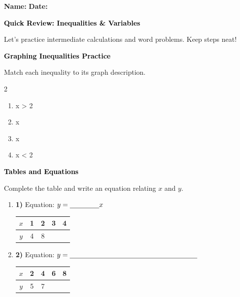 \documentclass[12pt, letterpaper, fleqn]{article}
\newcommand{\blank}{\underline{\hspace{2.2cm}}}
\newcommand{\blanklong}{\underline{\hspace{6.5cm}}}
\newcommand{\blankshorter}{\underline{\hspace{1.5cm}}}
\begin{document}
\textbf{Name:} \underline{\hspace{5cm}}
\hfill
\textbf{Date:} \underline{\hspace{3cm}}\\

\begin{tcolorbox}[colback=customteal!20]
    \large\textcolor{black}{\textbf{Quick Review: Inequalities \& Variables}}
\end{tcolorbox}

\vspace{3mm}
\noindent
Let's practice intermediate calculations and word problems. Keep steps neat!

\vspace{4mm}

\begin{tcolorbox}[colback=customteal!20]
\large\textcolor{black}{\textbf{Graphing Inequalities Practice}}
\end{tcolorbox}

\noindent
Match each inequality to its graph description.

\vspace{3mm}
\begin{multicols}{2}
\begin{enumerate}[itemsep=1cm, leftmargin=0.6cm]
\item x > 2 \quad \rightarrow \quad \blank
\item x  \quad \rightarrow \quad \blank
\item x  \quad \rightarrow \quad \blank
\item x < 2 \quad \rightarrow \quad \blank
\end{enumerate}
\end{multicols}
\newpage

\begin{tcolorbox}[colback=customteal!20]
\large\textcolor{black}{\textbf{Tables and Equations}}
\end{tcolorbox}

\noindent
Complete the table and write an equation relating $x$ and $y$.

\vspace{3mm}
\begin{enumerate}[itemsep=1.2cm, leftmargin=0.6cm]
\item \textbf{1)} Equation: $y = \blankshorter x$ \quad \quad \begin{tabular}{c|c|c|c|c} $x$ & 1 & 2 & 3 & 4 \\ \hline $y$ & 4 & 8 & \blank & \blank \end{tabular}
\vspace{1cm}
\item \textbf{2)} Equation: $y = \blanklong$ \quad \quad \begin{tabular}{c|c|c|c|c} $x$ & 2 & 4 & 6 & 8 \\ \hline $y$ & 5 & 7 & \blank & \blank \end{tabular}
\vspace{1cm}
\end{enumerate}
\newpage
\end{document}
